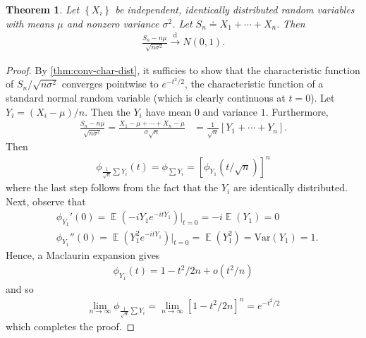 \documentclass[12pt]{article}
\DeclareMathOperator{\ex}{\mathbb{E}}
\newcommand{\var}{\mathrm{Var}}
\theoremstyle{plain}
\newtheorem{theorem}{Theorem}
\theoremstyle{definition}
\theoremstyle{remark}
\numberwithin{equation}{section}  %
\begin{document}
\begin{theorem}\label{thm:central-limit}
	Let $ \left\{ X_{i} \right\}$ be independent, identically
	distributed random variables with means $\mu$ and nonzero
	variance $\sigma^{2}$. Let $S_{n} \doteq X_{1} + \cdots + X_{n}.$ Then
	\begin{equation*}
	\begin{split}
		\frac{S_{n} - n \mu}{\sqrt{n \sigma^{2}}} \xrightarrow{\text{d}} N(0,1).
	\end{split}
	\end{equation*}
\end{theorem}
\begin{proof}
	By \cref{thm:conv-char-dist}, it sufficies to show that
	the characteristic function of $S_{n}/\sqrt{n \sigma^{2}}$ converges
	pointwise to  $e^{-t^{2}/2}$, the characteristic function of 
	a standard normal random variable (which is clearly
	continuous at $t=0$). Let
	$Y_{i} = (X_{i} - \mu)/n$. Then the $Y_{i}$ have mean $0$ and
	variance $1$. Furthermore, 
	\begin{equation*}
	\begin{split}
		\frac{S_{n} - n \mu}{\sqrt{n \sigma^{2}}}
		= \frac{X_{1} - \mu+ \cdots + X_{n} - \mu}{\sigma \sqrt{n}}
		& = \frac{1}{\sqrt{n}}\left[ Y_{1} + \cdots + Y_{n} \right].
	\end{split}
	\end{equation*}
Then
\begin{equation*}
\begin{split}
	\phi_{\frac{1}{\sqrt{n}}\sum Y_{i}}(t)
	= \phi_{\sum Y_{i}} = \left[ \phi_{Y_{1}}\left( t/\sqrt{n} \right) \right]^{n}
\end{split}
\end{equation*}
where the last step follows from the fact that the $Y_{i}$ are identically
distributed. Next, observe that
\begin{equation*}
\begin{split}
	& \phi_{Y_{1}}'(0) = \ex (-iY_{1} e^{-itY_{1}}) \vert_{t = 0} = -i
	\ex(Y_{1}) = 0
	\\
	& \phi_{Y_{1}}''(0) = \ex(Y_{1}^{2} e^{-itY_{1}}) \vert_{t = 0} = 
	\ex(Y_{1}^{2}) = \var(Y_{1}) = 1.
\end{split}
\end{equation*}
Hence, a Maclaurin expansion gives
\begin{equation*}
\begin{split}
	\phi_{Y_{1}}(t) = 1 - t^{2}/2n + o(t^{2}/n)
\end{split}
\end{equation*}
and so
\begin{equation*}
\begin{split}
	\lim_{n \to \infty} \phi_{\frac{1}{\sqrt{n}} \sum Y_{i}}
	= \lim_{n \to \infty} \left[ 1 - t^{2}/2n \right]^{n}
	= e^{-t^{2}/2}
\end{split}
\end{equation*}
which completes the proof.
\end{proof}
\end{document}
